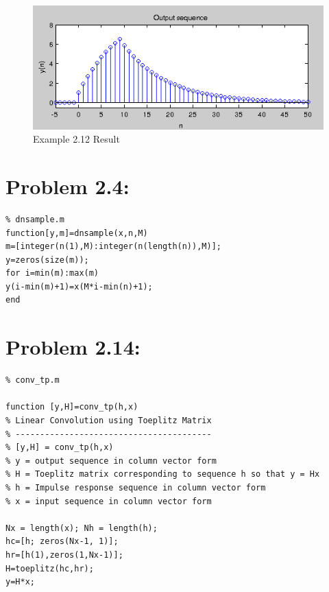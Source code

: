 \documentclass[11pt
  , a4paper
  , article
  , oneside
]{memoir}
\begin{document}
\begin{figure}[h!]
	\centering
	\includegraphics{./images/ex212.png}
	\caption{Example 2.12 Result}
	\label{fig:Example 2.12 Result}
\end{figure}

\chapter{Problem 2.4:}
\begin{lstlisting}[style=termstyle]
% Problem 2.4
% dnsample.m
function[y,m]=dnsample(x,n,M)
m=[integer(n(1),M):integer(n(length(n)),M)];
y=zeros(size(m));
for i=min(m):max(m)
y(i-min(m)+1)=x(M*i-min(n)+1);
end
\end{lstlisting}

\chapter{Problem 2.14:}
\begin{lstlisting}[style=termstyle]
% Problem 2.14
% conv_tp.m

function [y,H]=conv_tp(h,x)
% Linear Convolution using Toeplitz Matrix
% ----------------------------------------
% [y,H] = conv_tp(h,x)
% y = output sequence in column vector form
% H = Toeplitz matrix corresponding to sequence h so that y = Hx
% h = Impulse response sequence in column vector form
% x = input sequence in column vector form

Nx = length(x); Nh = length(h);
hc=[h; zeros(Nx-1, 1)];
hr=[h(1),zeros(1,Nx-1)];
H=toeplitz(hc,hr);
y=H*x;

\end{lstlisting}
\end{document}
